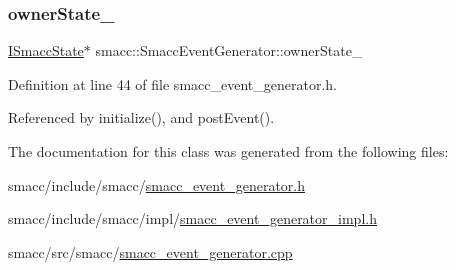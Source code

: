 \subsubsection{\texorpdfstring{owner\+State\+\_\+}{ownerState\_}}
{\footnotesize\ttfamily \hyperlink{classsmacc_1_1ISmaccState}{I\+Smacc\+State}$\ast$ smacc\+::\+Smacc\+Event\+Generator\+::owner\+State\+\_\+\hspace{0.3cm}{\ttfamily [private]}}



Definition at line 44 of file smacc\+\_\+event\+\_\+generator.\+h.



Referenced by initialize(), and post\+Event().



The documentation for this class was generated from the following files\+:\begin{DoxyCompactItemize}
\item 
smacc/include/smacc/\hyperlink{smacc__event__generator_8h}{smacc\+\_\+event\+\_\+generator.\+h}\item 
smacc/include/smacc/impl/\hyperlink{smacc__event__generator__impl_8h}{smacc\+\_\+event\+\_\+generator\+\_\+impl.\+h}\item 
smacc/src/smacc/\hyperlink{smacc__event__generator_8cpp}{smacc\+\_\+event\+\_\+generator.\+cpp}\end{DoxyCompactItemize}
